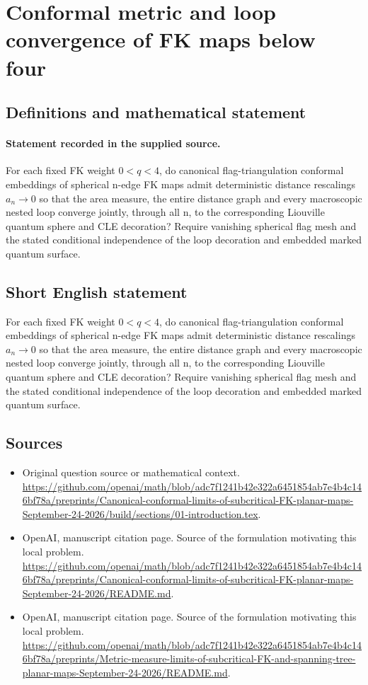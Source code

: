 \documentclass[11pt]{article}
\begin{document}
\section*{Conformal metric and loop convergence of FK maps below four}\label{30007353}
\subsection{Definitions and mathematical statement}
\paragraph{Statement recorded in the supplied source.}
For each fixed FK weight $0<q<4$, do canonical flag-triangulation conformal embeddings of spherical n-edge FK maps admit deterministic distance rescalings $a_n\to 0$ so that the area measure, the entire distance graph and every macroscopic nested loop converge jointly, through all n, to the corresponding Liouville quantum sphere and CLE decoration? Require vanishing spherical flag mesh and the stated conditional independence of the loop decoration and embedded marked quantum surface.
\subsection{Short English statement}
For each fixed FK weight $0<q<4$, do canonical flag-triangulation conformal embeddings of spherical n-edge FK maps admit deterministic distance rescalings $a_n\to 0$ so that the area measure, the entire distance graph and every macroscopic nested loop converge jointly, through all n, to the corresponding Liouville quantum sphere and CLE decoration? Require vanishing spherical flag mesh and the stated conditional independence of the loop decoration and embedded marked quantum surface.
\subsection{Sources}
\begin{itemize}
\item[S1] Original question source or mathematical context.
\url{https://github.com/openai/math/blob/adc7f1241b42e322a6451854ab7e4b4c146bf78a/preprints/Canonical-conformal-limits-of-subcritical-FK-planar-maps-September-24-2026/build/sections/01-introduction.tex}.
\item[S2] OpenAI, manuscript citation page. Source of the formulation motivating this local problem.
\url{https://github.com/openai/math/blob/adc7f1241b42e322a6451854ab7e4b4c146bf78a/preprints/Canonical-conformal-limits-of-subcritical-FK-planar-maps-September-24-2026/README.md}.
\item[S3] OpenAI, manuscript citation page. Source of the formulation motivating this local problem.
\url{https://github.com/openai/math/blob/adc7f1241b42e322a6451854ab7e4b4c146bf78a/preprints/Metric-measure-limits-of-subcritical-FK-and-spanning-tree-planar-maps-September-24-2026/README.md}.
\end{itemize}
\end{document}
